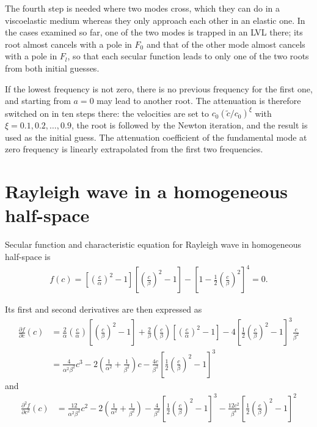 \documentclass[a4paper, 10pt]{article}
\begin{document}
The fourth step is needed where two modes cross, which they can do in a viscoelastic medium whereas they only approach each other in an elastic one.
In the cases examined so far, one of the two modes is trapped in an LVL there; its root almost cancels with a pole in $F_0$ and that of the other mode almost cancels with a pole in $F_l$, so that each secular function leads to only one of the two roots from both initial guesses.

If the lowest frequency is not zero, there is no previous frequency for the first one, and starting from $a = 0$ may lead to another root.
The attenuation is therefore switched on in ten steps there: the velocities are set to $c_0 (\tilde{c} / c_0)^{\xi}$ with $\xi = 0.1, 0.2, \dots, 0.9$, the root is followed by the Newton iteration, and the result is used as the initial guess.
The attenuation coefficient of the fundamental mode at zero frequency is linearly extrapolated from the first two frequencies.

\section{Rayleigh wave in a homogeneous half-space}

Secular function and characteristic equation for Rayleigh wave in homogeneous half-space is 
\begin{align}
  f(c) = 
  \left[ \left( \frac{c}{\alpha} \right)^2 - 1 \right]
  \left[ \left( \frac{c}{\beta} \right)^2 - 1 \right]
  - \left[ 1 - \frac{1}{2}\left( \frac{c}{\beta} \right)^2 \right]^4 = 0.
\end{align}

Its first and second derivatives are then expressed as 
\begin{align}
  \frac{\partial f}{\partial c}(c) &= 
  \frac{2}{\alpha}\left( \frac{c}{\alpha} \right)
  \left[ \left( \frac{c}{\beta} \right)^2 - 1 \right]
  +
  \frac{2}{\beta}\left( \frac{c}{\beta} \right)
  \left[ \left( \frac{c}{\alpha} \right)^2 - 1 \right]
  - 
  4 \left[\frac{1}{2}\left( \frac{c}{\beta} \right)^2 - 1 \right]^3 \frac{c}{\beta^2} 
  \\
  &= \frac{4}{\alpha^2 \beta^2}c^3 - 2\left( \frac{1}{\alpha^2} + \frac{1}{\beta^2} \right)c
  - 
  \frac{4c}{\beta^2} \left[\frac{1}{2}\left( \frac{c}{\beta} \right)^2 - 1 \right]^3 
\end{align}
and 
\begin{align}
  \frac{\partial^2 f}{\partial c^2}(c) 
  &= 
  \frac{12}{\alpha^2 \beta^2}c^2 - 2\left( \frac{1}{\alpha^2} + \frac{1}{\beta^2} \right)
  - 
  \frac{4}{\beta^2} \left[\frac{1}{2}\left( \frac{c}{\beta} \right)^2 - 1 \right]^3 
  - 
  \frac{12c^2}{\beta^4} \left[\frac{1}{2}\left( \frac{c}{\beta} \right)^2 - 1 \right]^2 
\end{align}
\end{document}
